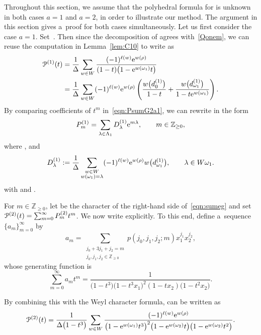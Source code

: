 \documentclass[pdftex]{sigma}
\numberwithin{equation}{section}
\theoremstyle{definition}
\newcommand{\Z}{\mathbb{Z}}
\newcommand{\res}{\operatorname{res}}
\newcommand{\PP}[2]{P^{(#1)}_{#2}}
\begin{document}
Throughout this section, we assume that the polyhedral formula for \smash{$\res W^{(a)}_m$} is unknown in both cases $a=1$ and $a=2$, in order to illustrate our method.
The argument in this section gives a~proof for both cases simultaneously.
Let us first consider the case $a=1$.
Set~. Then
since the decomposition of \smash{$\res W^{(1)}_m$} agrees with~\eqref{Qonem},
we can reuse the computation in Lemma~\ref{lem:C10} to write  as
\begin{align}
\mathcal{P}^{(1)}(t)&=
\frac{1}{\Delta}\sum_{w\in W} \frac{(-1)^{\ell(w)}{\rm e}^{w(\rho)}}{(1-t)\bigl(1-{\rm e}^{w(\omega_1)}t\bigr)}\nonumber\\
&=\frac{1}{\Delta}\sum_{w\in W}(-1)^{\ell(w)}{\rm e}^{w(\rho)}\left(\frac{w\bigl(d^{(1)}_{0}\bigr)}{1-t}+\frac{w\bigl(d^{(1)}_{\omega_1}\bigr)}{1-t {\rm e}^{w(\omega_1)}}\right).\label{eqn:PsumG2a1}
\end{align}
By comparing coefficients of $t^m$ in~\eqref{eqn:PsumG2a1}, we can rewrite  in the form
\begin{equation}\label{eqn:pp1}
P^{(1)}_m=\sum_{\lambda\in \Lambda_1}D^{(1)}_{\lambda}{\rm e}^{m\lambda},
\qquad m\in \Z_{\geq 0},
\end{equation}
where
,
and
\[
D^{(1)}_{\lambda}:=
\frac{1}{\Delta}\sum_{\substack{w\in W\\ w(\omega_1)=\lambda}}
(-1)^{\ell(w)}{\rm e}^{w(\rho)}w\bigl(d^{(1)}_{\omega_1}\bigr),
\qquad \lambda\in W\omega_1.
\]
with  and .

For $m\in \Z_{\geq 0}$, let \smash{$\PP{2}{m}$} be the character of the right-hand side of~\eqref{eqn:sumeg} and set $\smash{\mathcal{P}^{(2)}(t) }= \smash{\sum_{m=0}^{\infty}\PP2m t^m}$.
We now write  explicitly. To this end, define a~sequence $\{a_m\}_{m=0}^{\infty}$ by
\[
a_m=\sum_{
	\substack{
		j_0 + 3j_1 + j_2 = m\\
		j_0,j_1,j_2 \in \Z_{\geq 0}
	}
	}
p(j_0,j_1,j_2;m) x_1^{j_1}x_2^{j_2},
\]
whose generating function is
\[
\sum_{m=0}^{\infty}a_mt^m=\frac{1}{\bigl(1-t^3\bigr)\bigl(1-t^3 x_1\bigr)^2(1-t x_2)\bigl(1-t^2 x_2\bigr)}.
\]

By combining this with the Weyl character formula,  can be written as
\begin{equation}\label{eqn:PsumG2}
\mathcal{P}^{(2)}(t)=
\frac{1}{\Delta \bigl(1-t^3\bigr)}\sum_{w\in W} \frac{(-1)^{\ell(w)}{\rm e}^{w(\rho)}}{\bigl(1-{\rm e}^{w(\omega_1)}t^3\bigr)^2\bigl(1-{\rm e}^{w(\omega_2)}t\bigr)\bigl(1-{\rm e}^{w(\omega_2)}t^2\bigr)}.
\end{equation}
\end{document}
